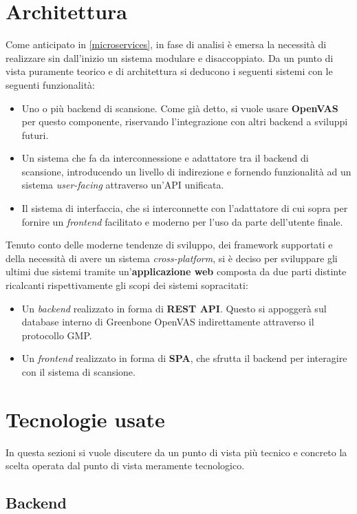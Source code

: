 \section{Architettura}
Come anticipato in \ref{microservices}, in fase di analisi è emersa la necessità di realizzare sin dall'inizio un sistema modulare e disaccoppiato. Da un punto di vista puramente teorico e di architettura si deducono i seguenti sistemi con le seguenti funzionalità:
\begin{itemize}
    \item Uno o più backend di scansione. Come già detto, si vuole usare \textbf{OpenVAS} per questo componente, riservando l'integrazione con altri backend a sviluppi futuri.
    \item Un sistema che fa da interconnessione e adattatore tra il backend di scansione, introducendo un livello di indirezione e fornendo funzionalità ad un sistema \emph{user-facing} attraverso un'API unificata.
    \item Il sistema di interfaccia, che si interconnette con l'adattatore di cui sopra per fornire un \emph{frontend} facilitato e moderno per l'uso da parte dell'utente finale.
\end{itemize}
Tenuto conto delle moderne tendenze di sviluppo, dei framework supportati e della necessità di avere un sistema \emph{cross-platform}, si è deciso per sviluppare gli ultimi due sistemi tramite un'\textbf{applicazione web} composta da due parti distinte ricalcanti rispettivamente gli scopi dei sistemi sopracitati:
\begin{itemize}
    \item Un \emph{backend} realizzato in forma di \textbf{REST API}. Questo si appoggerà sul database interno di Greenbone OpenVAS indirettamente attraverso il protocollo GMP.
    \item Un \emph{frontend} realizzato in forma di \textbf{SPA}, che sfrutta il backend per interagire con il sistema di scansione.
\end{itemize}

\section{Tecnologie usate}
In questa sezioni si vuole discutere da un punto di vista più tecnico e concreto la scelta operata dal punto di vista meramente tecnologico.

\subsection{Backend}

